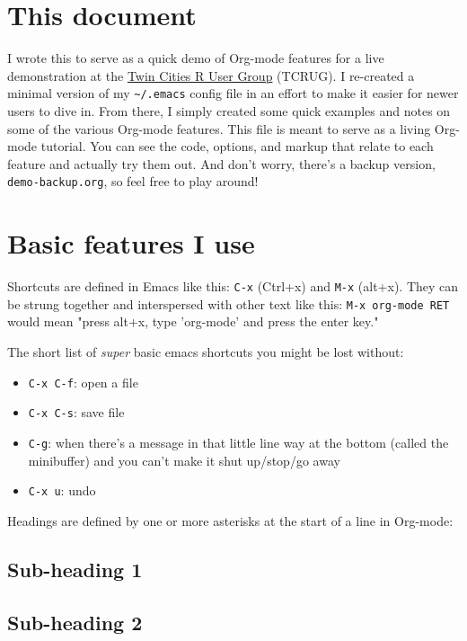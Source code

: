 \documentclass[11pt]{article}
\begin{document}
\section*{This document}
\label{sec:orgheadline2}

I wrote this to serve as a quick demo of Org-mode features for a live demonstration at the
\href{http://www.meetup.com/twincitiesrug/}{Twin Cities R User Group} (TCRUG). I re-created a minimal version of my \texttt{\textasciitilde{}/.emacs} config
file in an effort to make it easier for newer users to dive in. From there, I simply
created some quick examples and notes on some of the various Org-mode features. This file
is meant to serve as a living Org-mode tutorial. You can see the code, options, and
markup that relate to each feature and actually try them out. And don't worry, there's a
backup version, \texttt{demo-backup.org}, so feel free to play around! 

\section*{Basic features I use}
\label{sec:orgheadline8}

Shortcuts are defined in Emacs like this: \texttt{C-x} (Ctrl+x) and \texttt{M-x} (alt+x). They can be
strung together and interspersed with other text like this: \texttt{M-x org-mode RET} would mean
"press alt+x, type 'org-mode' and press the enter key."

The short list of \emph{super} basic emacs shortcuts you might be lost without:
\begin{itemize}
\item \texttt{C-x C-f}: open a file
\item \texttt{C-x C-s}: save file
\item \texttt{C-g}: when there's a message in that little line way at the bottom (called the
minibuffer) and you can't make it shut up/stop/go away
\item \texttt{C-x u}: undo
\end{itemize}

Headings are defined by one or more asterisks at the start of a line in Org-mode:
\subsection*{Sub-heading 1}
\label{sec:orgheadline3}
\subsection*{Sub-heading 2}
\label{sec:orgheadline4}
\end{document}
